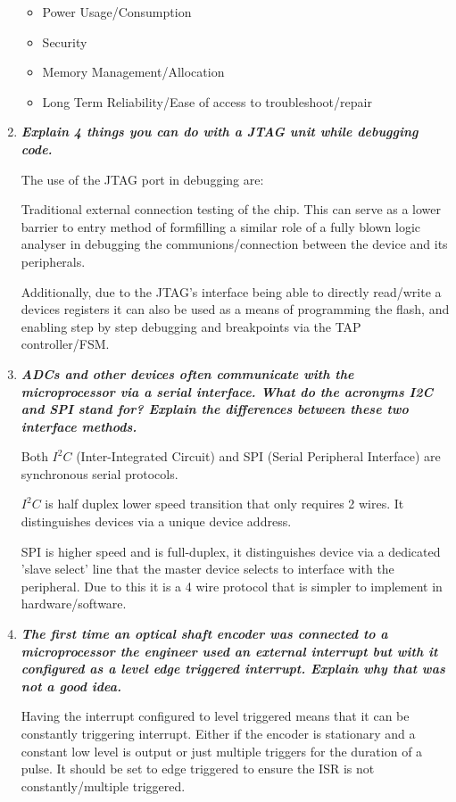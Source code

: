 \documentclass[11pt]{article}
\begin{document}
\begin{preview}
\begin{enumerate}
    \begin{itemize}
        \item Power Usage/Consumption
        \item Security
        \item Memory Management/Allocation
        \item Long Term Reliability/Ease of access to troubleshoot/repair 
    \end{itemize}
    
    \item \textit{\textbf{Explain 4 things you can do with a JTAG unit while debugging code.}}
    
    The use of the JTAG port in debugging are: 
    
    Traditional external connection testing of the chip. This can serve as a lower barrier to entry method of formfilling a similar role of a fully blown logic analyser in debugging the communions/connection between the device and its peripherals.

    Additionally, due to the JTAG's interface being able to directly read/write a devices registers it can also be used as a means of programming the flash, and enabling step by step debugging and breakpoints via the TAP controller/FSM.

    \item \textit{\textbf{ADCs and other devices often communicate with the microprocessor via a serial interface. What do the acronyms I2C and SPI stand for? Explain the differences between these two interface methods.}}

    Both $I^2C$ (Inter-Integrated Circuit) and SPI (Serial Peripheral Interface) are synchronous serial protocols.

    $I^2C$ is half duplex lower speed transition that only requires 2 wires. It distinguishes devices via a unique device address.

    SPI is higher speed and is full-duplex, it distinguishes device via a dedicated 'slave select' line that the master device selects to interface with the peripheral. Due to this it is a 4 wire protocol that is simpler to implement in hardware/software.
    
    \item \textit{\textbf{The first time an optical shaft encoder was connected to a microprocessor the engineer used an external interrupt but with it configured as a level edge triggered interrupt. Explain why that was not a good idea.}}
    
    Having the interrupt configured to level triggered means that it can be constantly triggering interrupt. Either if the encoder is stationary and a constant low level is output or just multiple triggers for the duration of a pulse. It should be set to edge triggered to ensure the ISR is not constantly/multiple triggered. 
    

\end{enumerate}
\end{preview}
\end{document}
